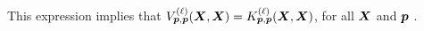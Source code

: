 \documentclass[accepted]{uai2021} %
\newcommand{\layerA}[2]{\mathbf{Z}^{(#1)}_{#2}(\mX)}
\newcommand{\layerC}[1]{C^{(#1)}}
\newcommand{\patch}{\vp}               %
\newcommand{\covf}[1]{K\ssup{#1}}
\newcommand{\nlinf}[1]{V\ssup{#1}}
\newcommand{\0}{\boldsymbol{0}}
\newcommand{\1}{\boldsymbol{1}}
\begin{document}
This expression implies that
$\nlinf{\ell}_{\patch,\patch}\bra{\mX,\mX} = \covf{\ell}_{\patch,\patch}\bra{\mX,\mX}$,
for all ${\bm{X}}$ and $\patch$ \citep{lee2018dnnlimit,matthews2018dnnlimit}.


\end{document}
